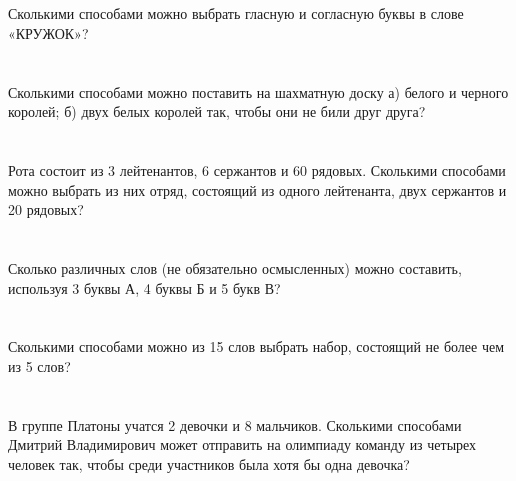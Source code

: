 \documentclass{article}%
\begin{document}
%
\section{}%
\label{sec:}%
Сколькими способами можно выбрать гласную и согласную буквы в слове «КРУЖОК»?%
%
\iffalse%
Автор: Ираклий Гагуа%
Дата: 07{-}01{-}2011%
Название: None%
Подсказка: \textbackslash{}\textbackslash{}%
nan%
\fi

%
\section{}%
\label{sec:}%
Сколькими способами можно поставить на шахматную доску а) белого и
черного королей; б) двух белых королей так, чтобы они не били друг
друга?%
%
\iffalse%
Автор: 25 школа%
Дата: 01{-}11{-}2012%
Название: None%
Подсказка: \textbackslash{}\textbackslash{}%
nan%
\fi

%
\section{}%
\label{sec:}%
Рота состоит из 3 лейтенантов, 6 сержантов и 60 рядовых. Сколькими способами
можно выбрать из них отряд, состоящий из одного лейтенанта, двух сержантов и 20
рядовых?%
%
\iffalse%
Автор: 25 школа%
Дата: 01{-}07{-}2017%
Название: None%
Подсказка: \textbackslash{}\textbackslash{}%
nan%
\fi

%
\section{}%
\label{sec:}%
Сколько различных слов (не обязательно осмысленных) можно составить, используя 3 буквы А, 4 буквы Б и 5 букв В?%
%
\iffalse%
Автор: Ираклий Гагуа%
Дата: 07{-}01{-}2011%
Название: None%
Подсказка: \textbackslash{}\textbackslash{}%
nan%
\fi

%
\section{}%
\label{sec:}%
Сколькими способами можно из 15 слов выбрать набор, состоящий не более чем
из 5 слов?%
%
\iffalse%
Автор: 25 школа%
Дата: 01{-}07{-}2017%
Название: None%
Подсказка: \textbackslash{}\textbackslash{}%
nan%
\fi

%
\section{}%
\label{sec:}%
В группе Платоны учатся 2 девочки и 8 мальчиков. Сколькими способами
Дмитрий Владимирович может отправить на олимпиаду команду из четырех человек
так, чтобы среди участников была хотя бы одна девочка?%
%
\iffalse%
Автор: 25 школа%
Дата: 01{-}07{-}2017%
Название: None%
Подсказка: \textbackslash{}\textbackslash{}%
nan%
\fi
\end{document}
